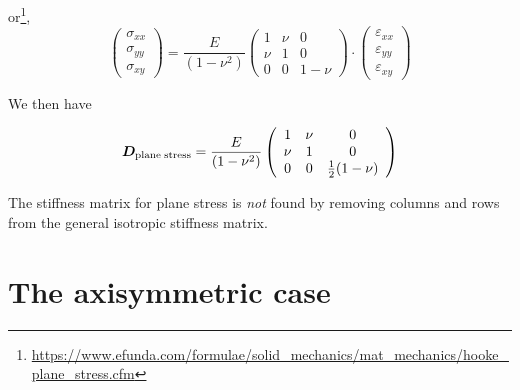 or\footnote{\url{https://www.efunda.com/formulae/solid_mechanics/mat_mechanics/hooke_plane_stress.cfm}}, 
\begin{equation}
\left(
\begin{array}{c}
\sigma_{xx}\\
\sigma_{yy}\\
\sigma_{xy}
\end{array}
\right)
=\frac{E}{(1-\nu^2)}
\left(
\begin{array}{ccc}
1 & \nu & 0 \\
\nu & 1 & 0 \\
0 &0 &1-\nu
\end{array}
\right)
\cdot
\left(
\begin{array}{c}
\varepsilon_{xx}\\
\varepsilon_{yy}\\
\varepsilon_{xy}
\end{array}
\right)
\end{equation}


We then have
\begin{mdframed}[backgroundcolor=blue!5]
\begin{equation}
{\bm D}_{\rm plane \; stress} = 
\frac{E}{(1-\nu^2)}
\left(
\begin{array}{ccc}
1 & \nu & 0 \\
\nu & 1 & 0 \\
0 &0 &\frac12(1-\nu)
\end{array}
\right)
\end{equation}
\end{mdframed}

\begin{remark}
The stiffness matrix for plane stress is {\it not} found by removing columns and rows from the general isotropic stiffness matrix. 
\end{remark}



\section{The axisymmetric case} \label{ss:fem_elast_axissymm}

